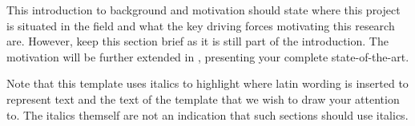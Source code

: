   This introduction to background and motivation should state where this project is situated in the field and what the key driving forces motivating this research are. However, keep this section brief as it is still part of the introduction. The motivation will be further extended in , presenting your complete state-of-the-art.

  Note that this template uses italics to highlight where latin wording is inserted to represent text and the text of the template that we wish to draw your attention to. The italics themself are not an indication that such sections should use italics.
\fi
